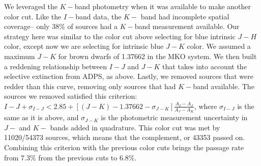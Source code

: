 We leveraged the $K-$band photometry when it was available to make another color cut.  Like the $I-$band data, the $K-$ band had incomplete spatial coverage-- only 38\% of sources had a $K-$band measurement available.  Our strategy here was similar to the color cut above selecting for blue intrinsic $J-H$ color, except now we are selecting for intrinsic blue $J-K$ color.  We assumed a maximum $J-K$ for brown dwarfs of 1.37662 in the MKO system.  We then built a reddening relationship between $I-J$ and $J-K$ that takes into account the selective extinction from ADPS, as above.  Lastly, we removed sources that were redder than this curve, removing only sources that had $K-$band available.  The sources we removed satisfied this criterion:  $I-J + \sigma_{I-J} < 2.85 + [(J-K) - 1.37662 - \sigma_{J-K}]\frac{A_I-A_J}{A_J - A_K}$, where $\sigma_{I-J}$ is the same as it is above, and $\sigma_{J-K}$ is the photometric measurement uncertainty in $J-$ and $K-$ bands added in quadrature.  This color cut was met by 11020/54373 sources, which means that the complement, or 43353 passed on.  Combining this criterion with the previous color cuts brings the passage rate from 7.3\% from the previous cuts to 6.8\%.

